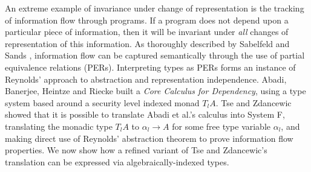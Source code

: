 An extreme example of invariance under change of representation is the
tracking of information flow through programs. If a program does not
depend upon a particular piece of information, then it will be
invariant under \emph{all} changes of representation of this
information. As thoroughly described by Sabelfeld and Sands
\cite{sabelfeld01per}, information flow can be captured semantically
through the use of partial equivalence relations (PERs). Interpreting
types as PERs forms an instance of Reynolds' approach to abstraction
and representation independence. Abadi, Banerjee, Heintze and Riecke
\cite{abadi99core} built a \emph{Core Calculus for Dependency}, using
a type system based around a security level indexed monad $T_lA$. Tse
and Zdancewic \cite{tse04translating} showed that it is possible to
translate Abadi et al.'s calculus into System F, translating the
monadic type $T_lA$ to $\alpha_l \to A$ for some free type variable
$\alpha_l$, and making direct use of Reynolds' abstraction theorem to
prove information flow properties. We now show how a refined variant
of Tse and Zdancewic's translation can be expressed via
algebraically-indexed types.

